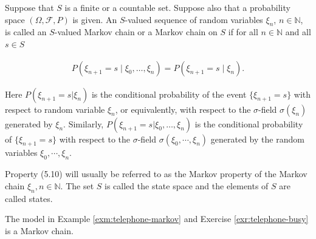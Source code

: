 \begin{Definition}
\label{def:markov-chain}
Suppose that $S$ is a finite or a countable set. Suppose also that a probability space $(\Omega, \mathcal{F}, P)$ is given. An $S$-valued sequence of random variables $\xi_n$, $n\in\mathbb{N}$, is called an $S$-valued Markov chain or a Markov chain on $S$ if for all $n\in\mathbb{N}$ and all $s\in S$

\begin{align}
P(\xi_{n+1} = s \mid \xi_0, \dots, \xi_n) = P(\xi_{n+1} = s \mid \xi_n). \tag{5.10}
\end{align}

Here $P(\xi_{n+1}=s|\xi_n)$ is the conditional probability of the event $\{\xi_{n+1}=s\}$ with respect to random variable $\xi_n$, or equivalently, with respect to the $\sigma$-field $\sigma(\xi_n)$ generated by $\xi_n$. Similarly, $P(\xi_{n+1}=s|\xi_0,\ldots,\xi_n)$ is the conditional probability of $\{\xi_{n+1}=s\}$ with respect to the $\sigma$-field $\sigma(\xi_0,\cdots,\xi_n)$ generated by the random variables $\xi_0,\cdots,\xi_n$.

Property (5.10) will usually be referred to as the Markov property of the Markov chain $\xi_n, n\in\mathbb{N}$. The set $S$ is called the state space and the elements of $S$ are called states.
\end{Definition}

\begin{Proposition}
\label{prp:telephone-is-markov}
The model in Example \ref{exm:telephone-markov} and Exercise \ref{exr:telephone-busy} is a Markov chain.
\end{Proposition}

